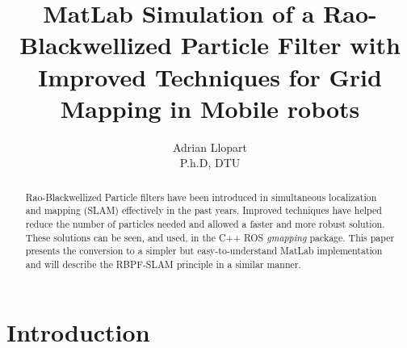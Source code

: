 \documentclass[letterpaper]{article}
\begin{document}
\title{MatLab Simulation of a Rao-Blackwellized Particle Filter with Improved Techniques for Grid Mapping in Mobile robots}
\author{Adrian Llopart \\ P.h.D, DTU }
\maketitle


\begin{abstract}
Rao-Blackwellized Particle filters have been introduced in simultaneous localization and mapping (SLAM) effectively in the past years. Improved techniques have helped reduce the number of particles needed and allowed a faster and more robust solution. These solutions can be seen, and used, in the C++ ROS \textit{gmapping} package. This paper presents the conversion to a simpler but easy-to-understand MatLab implementation and will describe the RBPF-SLAM principle in a similar manner.

\end{abstract}

\section{Introduction}
\end{document}
